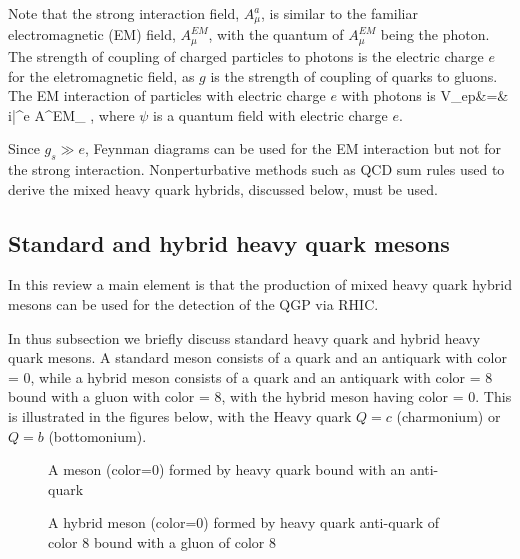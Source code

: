   Note that the strong interaction field, $A_\mu^a$, is similar to the familiar
electromagnetic (EM) field, $A^{EM}_\mu$, with the quantum of $A^{EM}_\mu$ 
being the photon. The strength of coupling of charged particles to photons is 
the electric charge $e$ for the eletromagnetic field, as $g$ is the strength of
coupling of quarks to gluons. The EM interaction of particles with electric
charge $e$ with photons is 
\beq
\label{epinteraction}
        V_{ep}&=& i\bar{\psi}\gamma^\mu e A^{EM}_\mu \psi
\; , 
\eeq
where $\psi$ is a quantum field with electric charge $e$.

    Since $g_s \gg e$, Feynman diagrams
can be used for the EM interaction but not for the strong interaction. 
Nonperturbative methods such as QCD sum rules used to derive the mixed heavy
quark hybrids, discussed below, must be used.

\subsection{Standard and hybrid heavy quark mesons}
In this review a main element is that the production of mixed heavy quark 
hybrid mesons can be used for the detection of the QGP via RHIC.

\newpage

In thus subsection we briefly discuss standard heavy quark and hybrid
heavy quark mesons. A standard meson consists of a quark and an antiquark with 
color = 0, while a hybrid meson consists of a quark and an antiquark with color
 = 8 bound with a gluon with color = 8, with the hybrid meson having color = 0. 
This is illustrated in the figures below, with the Heavy quark $Q=c$ 
(charmonium) or $Q=b$ (bottomonium).
\vspace{2cm}

\begin{figure}[ht]
\begin{center}
\end{center}
\caption{A meson (color=0) formed by heavy quark bound with an anti-quark}
\end{figure}

\begin{figure}[ht]
\begin{center}
\end{center}
\caption{A hybrid meson (color=0) formed by heavy quark anti-quark of color
8 bound with a gluon of color 8}
\end{figure}

